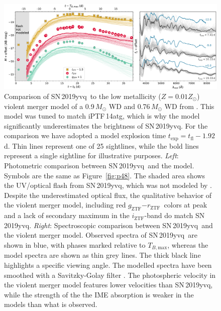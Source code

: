 \documentclass[twocolumn]{aastex63}
\newcommand{\rztf}{$r_\mathrm{ZTF}$}
\newcommand{\gztf}{$g_\mathrm{ZTF}$}
\newcommand{\iztf}{$i_\mathrm{ZTF}$}
\newcommand{\tbmax}{$T_{B,\mathrm{max}}$}
\newcommand{\sn}{SN\,2019yvq}
\begin{document}
\begin{figure}
    \centering
    \includegraphics[width=\textwidth]{./figures/violent_merger.pdf}
    \caption{Comparison of \sn\ to the low metallicity ($Z = 0.01 Z_\odot$)
    violent merger model of a 0.9\,$M_\odot$ WD and 0.76\,$M_\odot$ WD from
    \citet{Kromer16}. This model was tuned to match iPTF\,14atg, which is why
    the model significantly underestimates the brightness of \sn. For the
    comparison we have adopted a model explosion time $t_\mathrm{exp} =
    t_\mathrm{fl} - 1.92$\,d. Thin lines represent one of 25 sightlines, while
    the bold lines represent a single sightline for illustrative purposes.
    \textit{Left}: Photometric comparison between \sn\ and the model. Symbols
    are the same as Figure~\ref{fig:p48}. The shaded area shows the UV/optical
    flash from \sn, which was not modeled by \citet{Kromer16}. Despite the
    underestimated optical flux, the qualitative behavior of the violent
    merger model, including red \gztf$ - $\rztf\ colors at peak and a lack of
    secondary maximum in the \iztf-band do match \sn. \textit{Right}:
    Spectroscopic comparison between \sn\ and the violent merger model.
    Observed spectra of \sn\ are shown in blue, with phases marked relative to
    \tbmax, whereas the model spectra are shown as thin grey lines. The thick
    black line highlights a specific viewing angle. The modelled spectra have
    been smoothed with a Savitzky-Golay filter \citep{Savitzky64}. The
    photospheric velocity in the violent merger model features lower
    velocities than \sn, while the strength of the the IME absorption is
    weaker in the models than what is observed.}
    \label{fig:violent_merger}
\end{figure}
\end{document}
